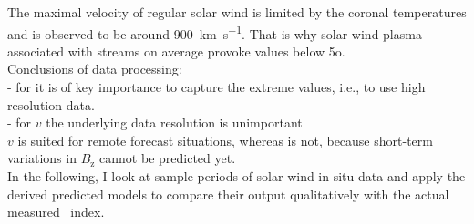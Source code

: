 The maximal velocity of regular solar wind is limited by the coronal temperatures \citep{Parker1958} and is observed to be around \SI{900}{\km\per\s}. That is why solar wind plasma associated with streams on average provoke \Kp{} values below 5o.\\

Conclusions of data processing:\\
- for \vBz{} it is of key importance to capture the extreme values, i.e., to use high resolution data.\\
- for $v$ the underlying data resolution is unimportant\\
$v$ is suited for remote forecast situations, whereas \vBz{} is not, because short-term variations in $B_\text{z}$ cannot be predicted yet.\\

In the following, I look at sample periods of solar wind in-situ data and apply the derived predicted models to compare their output qualitatively with the actual measured \Kp~index.\\

